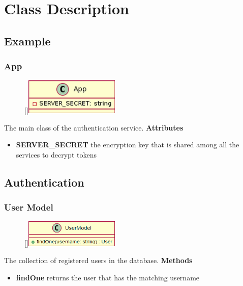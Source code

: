 \section{Class Description}
\subsection{Example}
\subsubsection{App}
\begin{figure}
    \raisebox{0pt}[\dimexpr{}\baselineskip\relax]{\includegraphics[width=4.5cm]{classes/auth/app.png}}
\end{figure} 
\par
The main class of the authentication service.
\newline
\newline
\textbf{Attributes}
\begin{itemize}
    \item \textbf{SERVER\_SECRET} the encryption key that is shared among all the services to decrypt tokens
\end{itemize}

\subsection{Authentication}

\subsubsection{User Model}
\begin{figure}
    \raisebox{0pt}[\dimexpr{}\baselineskip\relax]{\includegraphics[width=4.5cm]{classes/auth/1.png}}
\end{figure} 
\par
The collection of registered users in the database.
\newline
\newline
\textbf{Methods}
\begin{itemize}
    \item \textbf{findOne} returns the user that has the matching username
\end{itemize}

